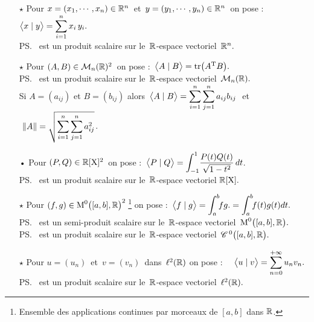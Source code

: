 \begin{itemize}
    \item[$\star$] Pour \(x=(x_1,\cdots,x_n)\in \mathbb{R}^n\,\) et \(\,y=(y_1,\cdots,y_n)\in \mathbb{R}^n\,\) on pose : \(\displaystyle \bigl\langle x\mid y \bigr\rangle=\sum_{i=1}^{n}x_i\,y_i.\)\vspace{-0.2cm}\\
    \ps\, est un produit scalaire sur le \(\,\mathbb{R}\)-espace vectoriel \(\,\mathbb{R}^n.\)\vspace{0.3cm}

    \item[$\star$] Pour \((A,B)\in \mathcal{M}_n(\mathbb{R})^2\,\) on pose : \(\,\bigl\langle A\mid B \bigr\rangle=\text{tr}\bigl(A\textsuperscript{T}B\bigr).\)\vspace{0.1cm}\\
    \ps\, est un produit scalaire sur le $\,\mathbb{R}$-espace vectoriel $\,\mathcal{M}_n(\mathbb{R}).$\vspace{-0.2cm}\\
    Si \(A=(a_{ij})\) et \(B=(b_{ij})\) alors \(\displaystyle \,\bigl\langle A\mid B \bigr\rangle=\sum_{i=1}^{n}\sum_{j=1}^{n}a_{ij}b_{ij}\ \) et \(\ \displaystyle \left\lVert A\right\rVert=\sqrt{\sum_{i=1}^{n}\sum_{j=1}^{n}a_{ij}^2}\).\vspace{0.2cm}

    \item[•] Pour \((P,Q)\in \mathbb{R}[\text{X}]^2\,\) on pose : \(\displaystyle \,\bigl\langle P\mid Q \bigr\rangle=\int_{-1}^{1}\!\frac{P(t)Q(t)}{\sqrt{1-t^2}}\,dt\).\vspace{0.2cm}\\
    \ps\, est un produit scalaire sur le $\,\mathbb{R}$-espace vectoriel \(\mathbb{R}[\text{X}].\)\vspace{0.3cm}

    \item[$\star$] Pour \((f,g)\in \text{M}^0\bigl([a,b],\mathbb{R}\bigr)^2\,\)\footnote{Ensemble des applications continues par morceaux de $[a,b]$ dans $\mathbb{R}$.} on pose : \(\displaystyle \,\bigl\langle f\mid g \bigr\rangle=\int_{a}^{b}\!\!fg.=\int_{a}^{b}\!\!f(t)g(t)dt.\) \vspace{0.1cm}\\
    \ps\, est un semi-produit scalaire sur le $\,\mathbb{R}$-espace vectoriel $\,\text{M}^0\bigl([a,b],\mathbb{R}\bigr).$\vspace{0.1cm}\\
    \ps\, est un produit scalaire sur le $\,\mathbb{R}$-espace vectoriel \(\,\mathscr{C}^{\,0}\bigl([a,b],\mathbb{R}\bigr).\)\vspace{0.3cm}

    \item[$\star$] Pour \(u=(u_n)\,\) et \(\,v=(v_n)\,\) dans \(\,\ell^2(\mathbb{R})\) on pose : \(\displaystyle \quad\bigl\langle u\mid v \bigr\rangle=\sum_{n=0}^{+\infty}u_nv_n.\)\\
    \ps\, est un produit scalaire sur le $\,\mathbb{R}$-espace vectoriel \(\,\ell^2(\mathbb{R}).\)
\end{itemize}


